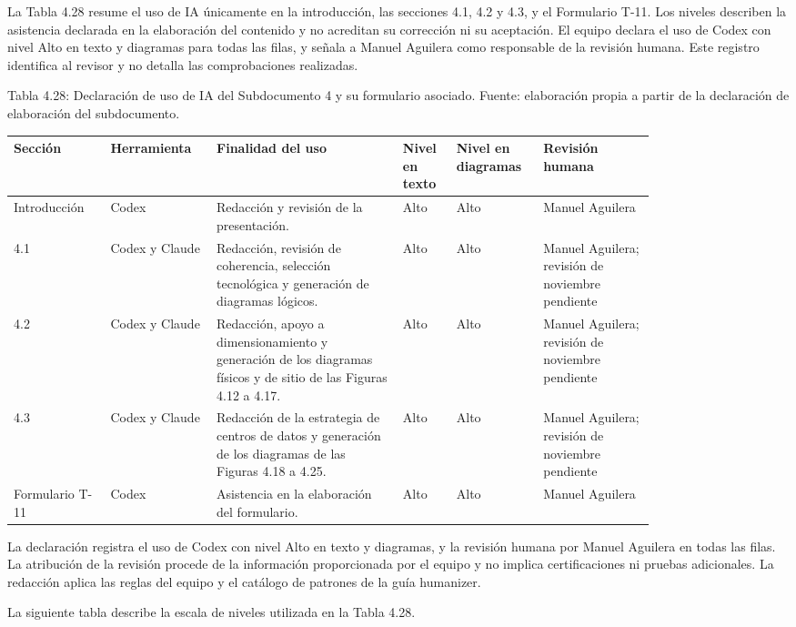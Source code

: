 \documentclass[11pt]{article}
\begin{document}
La Tabla 4.28 resume el uso de IA únicamente en la introducción, las secciones 4.1, 4.2 y 4.3, y el Formulario T-11. Los niveles describen la asistencia declarada en la elaboración del contenido y no acreditan su corrección ni su aceptación. El equipo declara el uso de Codex con nivel Alto en texto y diagramas para todas las filas, y señala a Manuel Aguilera como responsable de la revisión humana. Este registro identifica al revisor y no detalla las comprobaciones realizadas.

Tabla 4.28: Declaración de uso de IA del Subdocumento 4 y su formulario asociado. Fuente: elaboración propia a partir de la declaración de elaboración del subdocumento.\par\nopagebreak
\begin{longtable}{@{}p{0.13\linewidth}p{0.12\linewidth}p{0.25\linewidth}p{0.075\linewidth}p{0.095\linewidth}p{0.15\linewidth}@{}}
\toprule Sección & Herramienta & Finalidad del uso & Nivel en texto & Nivel en diagramas & Revisión humana \\
\midrule\endhead\bottomrule\endlastfoot
Introducción & Codex & Redacción y revisión de la presentación. & Alto & Alto & Manuel Aguilera \\
4.1 & Codex y Claude & Redacción, revisión de coherencia, selección tecnológica y generación de diagramas lógicos. & Alto & Alto & Manuel Aguilera; revisión de noviembre pendiente \\
4.2 & Codex y Claude & Redacción, apoyo a dimensionamiento y generación de los diagramas físicos y de sitio de las Figuras 4.12 a 4.17. & Alto & Alto & Manuel Aguilera; revisión de noviembre pendiente \\
4.3 & Codex y Claude & Redacción de la estrategia de centros de datos y generación de los diagramas de las Figuras 4.18 a 4.25. & Alto & Alto & Manuel Aguilera; revisión de noviembre pendiente \\
Formulario T-11 & Codex & Asistencia en la elaboración del formulario. & Alto & Alto & Manuel Aguilera \\
\end{longtable}

La declaración registra el uso de Codex con nivel Alto en texto y diagramas, y la revisión humana por Manuel Aguilera en todas las filas. La atribución de la revisión procede de la información proporcionada por el equipo y no implica certificaciones ni pruebas adicionales. La redacción aplica las reglas del equipo y el catálogo de patrones de la guía humanizer.

La siguiente tabla describe la escala de niveles utilizada en la Tabla 4.28.
\end{document}
